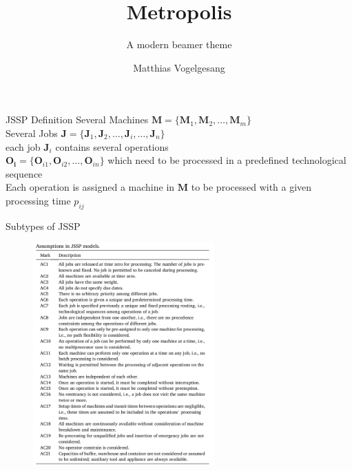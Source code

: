 \documentclass[8pt, xcolor=table]{beamer}
\title{Metropolis}
\subtitle{A modern beamer theme}
\date{}
\author{Matthias Vogelgesang}
\institute{Center for modern beamer themes}
\begin{document}


\begin{frame}[fragile]{JSSP Definition}
    Several Machines $\bm{M}= \{\bm{M}_1, \bm{M}_2, \ldots, \bm{M}_m\}$\\
    Several Jobs $\bm{J}= \{\bm{J}_1, \bm{J}_2, \ldots,\bm{J}_i,\ldots, \bm{J}_n\}$ \\
    each job $\bm{J}_i$ contains several operations\\
    $\bm{O_i}= \{\bm{O}_{i1}, \bm{O}_{i2},\ldots, \bm{O}_{in}\}$ which need to be processed in a predefined technological sequence\\
    Each operation is assigned a machine in $\bm{M}$ to be processed with a given processing time $p_{ij}$
\end{frame}

\begin{frame}[fragile]{Subtypes of JSSP}
    \begin{figure}[H]
      \includegraphics[width=0.62\textwidth]{img/subtypes.png}
    \end{figure}
\end{frame}
\end{document}
